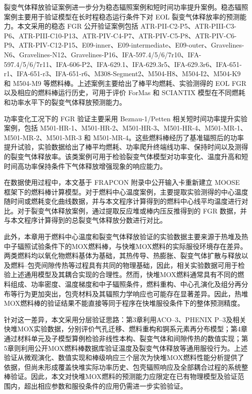 裂变气体释放验证案例进一步分为稳态辐照案例和短时间功率提升案例。稳态辐照案例主要用于验证模型在长时程稳态运行条件下对 EOL 裂变气体释放率的预测能力。本文采用的稳态 FGR 公开验证案例包括 ATR-PII-C2-P5、ATR-PIII-C3-P6、ATR-PIII-C10-P13、ATR-PIV-C4-P7、ATR-PIV-C5-P8、ATR-PIV-C6-P9、ATR-PIV-C12-P15、E09-inner、E09-intermediate、E09-outer、Gravelines-N6、Gravelines-N12、Gravelines-P16、IFA-597.4/5/6/7r10、IFA-597.4/5/6/7r11、IFA-606-P2、IFA-629.1、IFA-629.3r5、IFA-629.3r6、IFA-651-r1、IFA-651-r3、IFA-651-r6、M308-Segment2、M504-H8、M504-I2、M504-K9 和 M504-M9 等燃料棒。上述案例主要给出了棒平均燃耗、实验测得的 EOL FGR 以及相应的燃料棒运行历史，可用于评价 ForMas 和 SCIANTIX 模型在不同燃耗和功率水平下的裂变气体释放预测能力。

功率变化工况下的 FGR 验证主要采用 Beznau-1/Petten 相关短时间功率提升实验案例，包括 M501-HR-1、M501-HR-2、M501-HR-3、M501-HR-4、M501-MR-1、M501-MR-2、M501-MR-3 和 M501-MR-4。这些燃料棒经历了基准辐照后的功率提升试验，实验数据给出了棒平均燃耗、功率爬升终端线功率、保持时间以及测得的裂变气体释放率。该类案例可用于检验裂变气体模型对功率变化、温度升高和短时间高功率保持条件下气体释放增强现象的响应能力。

在数据使用过程中，本文基于 FRAPCON 附录中公开输入卡重新建立 MOOSE 框架下的燃料棒计算模型。对于燃料中心温度案例，主要提取实验测得的中心温度随时间或燃耗变化曲线数据，并与本文程序计算得到的燃料中心线平均温度进行对比。对于裂变气体释放案例，通过提取反应堆或棒内压反推得到的 FGR 数据，并与本文程序计算得到的总裂变气体释放分数进行对比。

此外，本章用于燃料中心温度和裂变气体释放验证的实验数据主要来源于热堆及热中子辐照试验条件下的MOX燃料棒，与快堆MOX燃料的实际服役环境存在差异。两类燃料均以氧化物燃料基体为基础，其热传导、热膨胀、裂变气体扩散与释放以及燃料–包壳间隙传热等过程具有共同的物理基础，因此，相关实验数据可用于检验上述通用模型及其耦合实现的合理性。然而，快堆MOX燃料通常具有不同的燃料组成、功率密度、温度梯度和中子辐照条件，燃料重构、中心孔演化及组分再分布等行为更加突出，包壳材料及其辐照力学响应也可能存在显著差异。因此，热堆MOX燃料棒的验证结果不能直接等同于程序在快堆服役条件下的整体预测精度。

针对这一差异，本文采用分层验证思路：第3章利用ACO–3、PHENIX P–3及相关快堆MOX实验数据，分别评价气孔迁移、燃料重构和锕系元素再分布模型；第4章通过材料单元及子模型算例检验非线性本构、裂变气体和间隙传热的数值实现；第5章则利用公开MOX燃料棒数据库验证温度及裂变气体释放等通用服役行为。上述验证从微观演化、数值实现和棒级响应三个层次为快堆MOX燃料性能分析提供了依据，但尚未形成覆盖快堆实际功率历史、包壳辐照响应及全部耦合过程的系统整棒验证。因此，本文对快堆MOX燃料的预测能力应限定在已有物理模型及验证范围内，超出相应参数和服役条件的应用仍需进一步实验验证。

